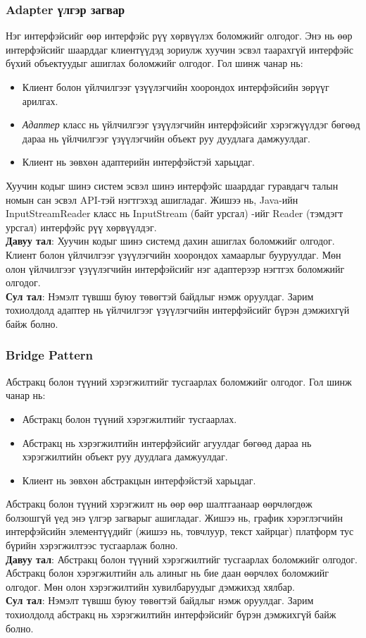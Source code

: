 \subsubsection{Adapter үлгэр загвар}
\quad \quad Нэг интерфэйсийг өөр интерфэйс рүү хөрвүүлэх боломжийг олгодог. Энэ нь өөр интерфэйсийг шаарддаг клиентүүдэд зориулж хуучин эсвэл таарахгүй интерфэйс бүхий объектуудыг ашиглах боломжийг олгодог. Гол шинж чанар нь:
\begin{itemize}
	\item Клиент болон үйлчилгээг үзүүлэгчийн хоорондох интерфэйсийн зөрүүг арилгах.
	\item \textit{Адаптер} класс нь үйлчилгээг үзүүлэгчийн интерфэйсийг хэрэгжүүлдэг бөгөөд дараа нь үйлчилгээг үзүүлэгчийн объект руу дуудлага дамжуулдаг.
	\item Клиент нь зөвхөн адаптерийн интерфэйстэй харьцдаг.
\end{itemize}
Хуучин кодыг шинэ систем эсвэл шинэ интерфэйс шаарддаг гуравдагч талын номын сан эсвэл API-тэй нэгтгэхэд ашигладаг. Жишээ нь, Java-ийн InputStreamReader класс нь InputStream (байт урсгал) -ийг Reader (тэмдэгт урсгал) интерфэйс рүү хөрвүүлдэг.\\
\textbf{Давуу тал}: Хуучин кодыг шинэ системд дахин ашиглах боломжийг олгодог. Клиент болон үйлчилгээг үзүүлэгчийн хоорондох хамаарлыг бууруулдаг. Мөн олон үйлчилгээг үзүүлэгчийн интерфэйсийг нэг адаптерээр нэгтгэх боломжийг олгодог.\\
\textbf{Сул тал}: Нэмэлт түвшш буюу төвөгтэй байдлыг нэмж оруулдаг. Зарим тохиолдолд адаптер нь үйлчилгээг үзүүлэгчийн интерфэйсийг бүрэн дэмжихгүй байж болно.

\subsubsection{Bridge Pattern}
\quad \quad Абстракц болон түүний хэрэгжилтийг тусгаарлах боломжийг олгодог. Гол шинж чанар нь:
\begin{itemize}
	\item Абстракц болон түүний хэрэгжилтийг тусгаарлах.
	\item Абстракц нь хэрэгжилтийн интерфэйсийг агуулдаг бөгөөд дараа нь хэрэгжилтийн объект руу дуудлага дамжуулдаг.
	\item Клиент нь зөвхөн абстракцын интерфэйстэй харьцдаг.
\end{itemize}
Абстракц болон түүний хэрэгжилт нь өөр өөр шалтгаанаар өөрчлөгдөж болзошгүй үед энэ үлгэр загварыг ашигладаг. Жишээ нь, график хэрэглэгчийн интерфэйсийн элементүүдийг (жишээ нь, товчлуур, текст хайрцаг) платформ тус бүрийн хэрэгжилтээс тусгаарлаж болно.\\
\textbf{Давуу тал}: Абстракц болон түүний хэрэгжилтийг тусгаарлах боломжийг олгодог. Абстракц болон хэрэгжилтийн аль алиныг нь бие даан өөрчлөх боломжийг олгодог. Мөн олон хэрэгжилтийн хувилбаруудыг дэмжихэд хялбар.\\
\textbf{Сул тал}: Нэмэлт түвшш буюу төвөгтэй байдлыг нэмж оруулдаг. Зарим тохиолдолд абстракц нь хэрэгжилтийн интерфэйсийг бүрэн дэмжихгүй байж болно.	

